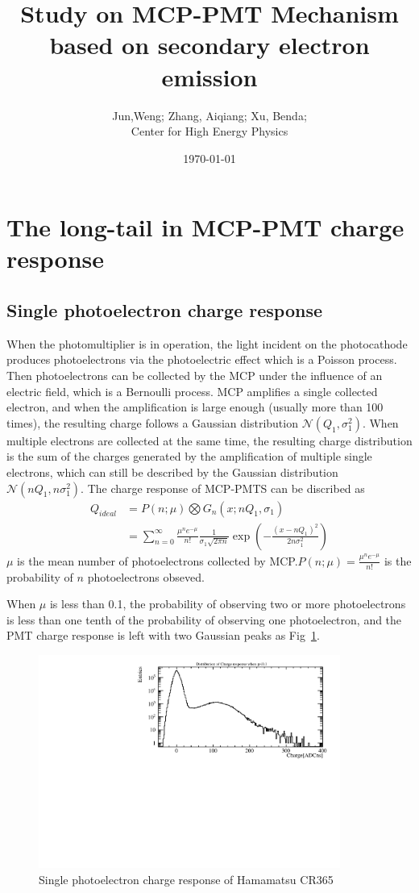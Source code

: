 \documentclass{article}
\title{Study on MCP-PMT Mechanism based on secondary electron emission}
\author{Jun,Weng; Zhang, Aiqiang; Xu, Benda; \\ Center for High Energy Physics}
\date{\today}
\begin{document}
\maketitle
\section{The long-tail in MCP-PMT charge response }\label{sec:long-tail}
\subsection{Single photoelectron charge response}\label{subsec:statistical}
When the photomultiplier is in operation, the light incident on the photocathode produces photoelectrons via the photoelectric effect 
which is a Poisson process. Then photoelectrons can be collected by the MCP under the influence of an electric field, which is a Bernoulli process.
MCP amplifies a single collected  electron, and when the amplification is large enough (usually more than 100 times), 
the resulting charge follows a Gaussian distribution $\mathcal{N} (Q_1, \sigma_1^2)$. When multiple electrons are collected at the same time, the resulting charge
distribution is the sum of the charges generated by the amplification of multiple single electrons, 
which can still be described by the Gaussian distribution $\mathcal{N} (nQ_1, n\sigma_1^2)$.
The charge response of MCP-PMTS can be discribed as ~\cite{1994Absolute}
\begin{equation}
    \begin{aligned}
        Q_{ideal} &= P(n;\mu)\bigotimes G_n(x;nQ_1,\sigma_1)\\
                  &=\sum_{n = 0}^{\infty}\frac{\mu^n e^{-\mu}}{n!}\frac{1}{\sigma_1\sqrt{2\pi n}}\exp(-\frac{{(x-nQ_1)}^2}{2n\sigma_1^2})  
    \end{aligned}
    \label{eq:sreal}
\end{equation}
$\mu$ is the mean number of photoelectrons collected by MCP.\@ $P(n;\mu) = \frac{\mu^n e^{-\mu}}{n!}$ is the probability of $n$ photoelectrons obseved. 

When $\mu$ is less than 0.1, the probability of observing two or more photoelectrons is less than one tenth of the probability 
of observing one photoelectron, and the PMT charge response is left with two Gaussian peaks as Fig~\ref{fig:spe_sreal}.
\begin{figure}[ht]
    \centering
    \includegraphics[height=7cm]{pic/siglepe.pdf}
    \caption{Single photoelectron charge response of Hamamatsu CR365}\label{fig:spe_sreal}
\end{figure}
\end{document}
